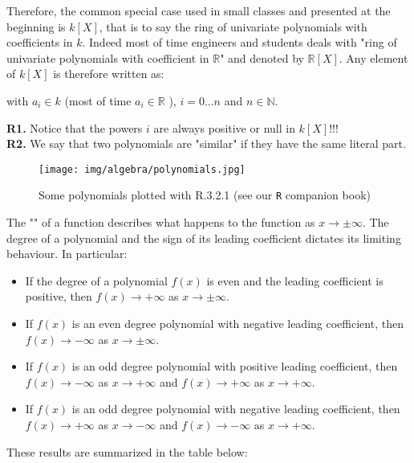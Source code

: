 	Therefore, the common special case used in small classes and presented at the beginning is $k[X]$, that is to say the ring of univariate polynomials with coefficients in $k$. Indeed most of time engineers and students deals with "ring of univariate polynomials with coefficient in $\mathbb{R}$" and denoted by $\mathbb{R}[X]$. Any element of $k[X]$ is therefore written as:
	
	with $a_i\in k$ (most of time  $a_i\in \mathbb{R}$ ), $i=0...n$ and $n\in \mathbb{N}$.
	\begin{tcolorbox}[title=Remarks,colframe=black,arc=10pt]
	\textbf{R1.} Notice that the powers $i$ are always positive or null in $k[X]$!!!\\
	
	\textbf{R2.} We say that two polynomials are "similar" if they have the same literal part.
	\end{tcolorbox}
	\begin{figure}[H]
		\centering
		\texttt{[image: img/algebra/polynomials.jpg]}
		\caption[Some polynomials plotted with R.3.2.1]{Some polynomials plotted with R.3.2.1 (see our \texttt{R} companion book)}
	\end{figure}
	The "" of a function describes what happens to the function as $x\rightarrow \pm\infty$. The degree of a polynomial and the sign of its leading coefficient dictates its limiting behaviour. In particular:
	\begin{itemize}
		\item If the degree of a polynomial $f(x)$ is even and the leading coefficient is positive, then $f(x)\rightarrow +\infty$ as $x\rightarrow \pm\infty$.
		
		\item If $f(x)$ is an even degree polynomial with negative leading coefficient, then $f(x)\rightarrow -\infty$ as $x\rightarrow \pm\infty$. 
		
		\item If $f(x)$ is an odd degree polynomial with positive leading coefficient, then $f(x)\rightarrow -\infty$ as $x\rightarrow +\infty$ and $f(x)\rightarrow +\infty$ as $x\rightarrow +\infty$.
 
		\item If $f(x)$ is an odd degree polynomial with negative leading coefficient, then $f(x)\rightarrow +\infty$ as $x\rightarrow -\infty$ and $f(x)\rightarrow -\infty$ as $x\rightarrow +\infty$.
	\end{itemize}
	These results are summarized in the table below:	
